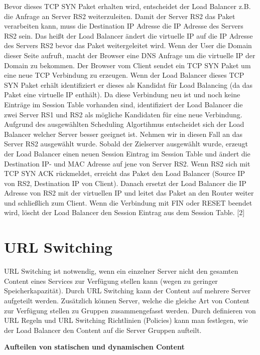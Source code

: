 Bevor dieses TCP SYN Paket erhalten wird, entscheidet der Load Balancer z.B. die Anfrage an Server RS2 weiterzuleiten. Damit der Server RS2 das Paket verarbeiten kann, muss die Destination IP Adresse die IP Adresse des Servers RS2 sein. Das heißt der Load Balancer ändert die virtuelle IP auf die IP Adresse des Servers RS2 bevor das Paket weitergeleitet wird.   
Wenn der User die Domain dieser Seite aufruft, macht der Browser eine DNS Anfrage um die virtuelle IP der Domain zu bekommen. Der Browser vom Client sendet ein TCP SYN Paket um eine neue TCP Verbindung zu erzeugen. Wenn der Load Balancer dieses TCP SYN Paket erhält identifiziert er dieses als Kandidat für Load Balancing (da das Paket eine virtuelle IP enthält). Da diese Verbindung neu ist und noch keine Einträge im Session Table vorhanden sind, identifiziert der Load Balancer die zwei Server RS1 und RS2 als mögliche Kandidaten für eine neue Verbindung. Aufgrund des ausgewählten Scheduling Algortihmus entscheidet sich der Load Balancer welcher Server besser geeignet ist. Nehmen wir in diesen Fall an das Server RS2 ausgewählt wurde. Sobald der Zielserver ausgewählt wurde, erzeugt der Load Balancer einen neuen Session Eintrag im Session Table und ändert die Destination IP- und MAC Adresse auf jene von Server RS2. Wenn RS2 sich mit TCP SYN ACK rückmeldet, erreicht das Paket den Load Balancer (Source IP von RS2, Destination IP von Client). Danach ersetzt der Load Balancer die IP Adresse von RS2 mit der virtuellen IP und leitet das Paket an den Router weiter und schließlich zum Client. Wenn die Verbindung mit FIN oder RESET beendet wird, löscht der Load Balancer den Session Eintrag aus dem Session Table. [2]

\section{URL Switching}
\label{sec:URL Switching}

URL Switching ist notwendig, wenn ein einzelner Server nicht den gesamten Content eines Services zur Verfügung stellen kann (wegen zu geringer Speicherkapazität). Durch URL  Switching kann der Content auf mehrere Server aufgeteilt werden. Zusätzlich können Server, welche die gleiche Art von Content zur Verfügung stellen zu Gruppen zusammengefasst werden. Durch definieren von URL Regeln und URL Switching Richtlinien (Policies) kann man festlegen, wie der Load Balancer den Content auf die Server Gruppen aufteilt. 

\textbf{Aufteilen von statischen und dynamischen Content} \\

